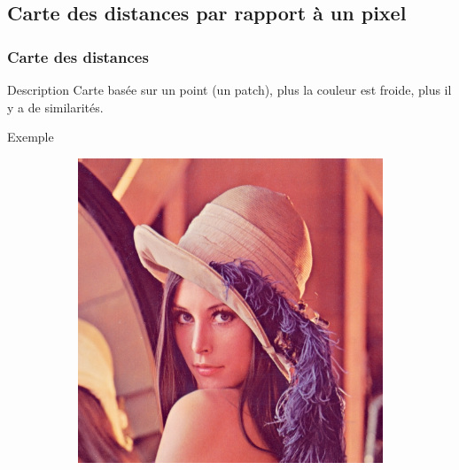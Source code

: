 \documentclass{beamer}
\begin{document}
\subsection{Carte des distances par rapport à un pixel}
\begin{frame}
    \frametitle{Carte des distances}
    \begin{block}{Description}
        Carte basée sur un point (un patch), plus la couleur est froide, plus il y a de similarités.
    \end{block}
    \begin{exampleblock}{Exemple}
        \begin{figure}[h]
            \centering
            \begin{subfigure}{0.3\textwidth}
                \includegraphics[width=\textwidth]{img/lena}
                \caption{}
            \end{subfigure}
            \begin{subfigure}{0.3\textwidth}

\end{subfigure}
\end{figure}
\end{exampleblock}
\end{frame}
\end{document}
